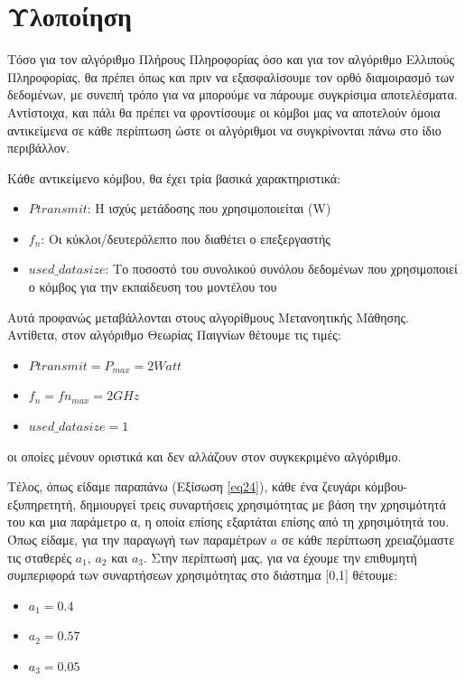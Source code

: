 \section{Υλοποίηση}

Τόσο για τον αλγόριθμο Πλήρους Πληροφορίας όσο και για τον αλγόριθμο Ελλιπούς Πληροφορίας, θα πρέπει όπως και πριν να εξασφαλίσουμε τον ορθό διαμοιρασμό των δεδομένων, με συνεπή τρόπο για να μπορούμε να πάρουμε συγκρίσιμα αποτελέσματα. Αντίστοιχα, και πάλι θα πρέπει να φροντίσουμε οι κόμβοι μας να αποτελούν όμοια αντικείμενα σε κάθε περίπτωση ώστε οι αλγόριθμοι να συγκρίνονται πάνω στο ίδιο περιβάλλον.

Κάθε αντικείμενο κόμβου, θα έχει τρία βασικά χαρακτηριστικά:
\begin{itemize}
    \item $Ptransmit$: Η ισχύς μετάδοσης που χρησιμοποιείται (W)
    \item $f_n$: Οι κύκλοι/δευτερόλεπτο που διαθέτει ο επεξεργαστής
    \item $used\_datasize$: Το ποσοστό του συνολικού συνόλου δεδομένων που χρησιμοποιεί ο κόμβος για την εκπαίδευση του μοντέλου του   
\end{itemize}

Αυτά προφανώς μεταβάλλονται στους αλγορίθμους Μετανοητικής Μάθησης. Αντίθετα, στον αλγόριθμο Θεωρίας Παιγνίων θέτουμε τις τιμές:
\begin{itemize}
    \item $Ptransmit = P_{max} = 2 Watt$
    \item $f_n = fn_{max} = 2 GHz$
    \item $used\_datasize = 1$   
\end{itemize}
οι οποίες μένουν οριστικά και δεν αλλάζουν στον συγκεκριμένο αλγόριθμο.

Τέλος, όπως είδαμε παραπάνω (Εξίσωση \ref{eq24}), κάθε ένα ζευγάρι κόμβου-εξυπηρετητή, δημιουργεί τρεις συναρτήσεις χρησιμότητας με βάση την χρησιμότητά του και μια παράμετρο α, η οποία επίσης εξαρτάται επίσης από τη χρησιμότητά του. Όπως είδαμε, για την παραγωγή των παραμέτρων $a$ σε κάθε περίπτωση χρειαζόμαστε τις σταθερές $a_1$, $a_2$ και $a_3$. Στην περίπτωσή μας, για να έχουμε την επιθυμητή συμπεριφορά των συναρτήσεων χρησιμότητας στο διάστημα [0,1] θέτουμε:

\begin{itemize}
    \item $a_1 = 0.4$
    \item $a_2 = 0.57$
    \item $a_3 = 0.05$
\end{itemize}

